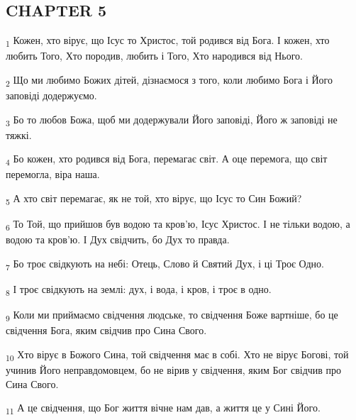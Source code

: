 \subsection{CHAPTER 5}
\begin{tcolorbox}
\textsubscript{1} Кожен, хто вірує, що Ісус то Христос, той родився від Бога. І кожен, хто любить Того, Хто породив, любить і Того, Хто народився від Нього.
\end{tcolorbox}
\begin{tcolorbox}
\textsubscript{2} Що ми любимо Божих дітей, дізнаємося з того, коли любимо Бога і Його заповіді додержуємо.
\end{tcolorbox}
\begin{tcolorbox}
\textsubscript{3} Бо то любов Божа, щоб ми додержували Його заповіді, Його ж заповіді не тяжкі.
\end{tcolorbox}
\begin{tcolorbox}
\textsubscript{4} Бо кожен, хто родився від Бога, перемагає світ. А оце перемога, що світ перемогла, віра наша.
\end{tcolorbox}
\begin{tcolorbox}
\textsubscript{5} А хто світ перемагає, як не той, хто вірує, що Ісус то Син Божий?
\end{tcolorbox}
\begin{tcolorbox}
\textsubscript{6} То Той, що прийшов був водою та кров'ю, Ісус Христос. І не тільки водою, а водою та кров'ю. І Дух свідчить, бо Дух то правда.
\end{tcolorbox}
\begin{tcolorbox}
\textsubscript{7} Бо троє свідкують на небі: Отець, Слово й Святий Дух, і ці Троє Одно.
\end{tcolorbox}
\begin{tcolorbox}
\textsubscript{8} І троє свідкують на землі: дух, і вода, і кров, і троє в одно.
\end{tcolorbox}
\begin{tcolorbox}
\textsubscript{9} Коли ми приймаємо свідчення людське, то свідчення Боже вартніше, бо це свідчення Бога, яким свідчив про Сина Свого.
\end{tcolorbox}
\begin{tcolorbox}
\textsubscript{10} Хто вірує в Божого Сина, той свідчення має в собі. Хто не вірує Богові, той учинив Його неправдомовцем, бо не вірив у свідчення, яким Бог свідчив про Сина Свого.
\end{tcolorbox}
\begin{tcolorbox}
\textsubscript{11} А це свідчення, що Бог життя вічне нам дав, а життя це у Сині Його.
\end{tcolorbox}
